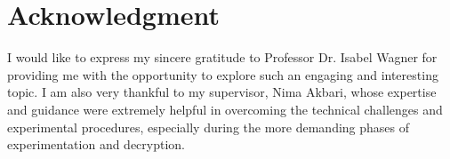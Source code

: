 \chapter{Acknowledgment}

I would like to express my sincere gratitude to Professor Dr. Isabel Wagner for providing me with the opportunity to explore such an engaging and interesting topic. I am also very thankful to my supervisor, Nima Akbari, whose expertise and guidance were extremely helpful in overcoming the technical challenges and experimental procedures, especially during the more demanding phases of experimentation and decryption.